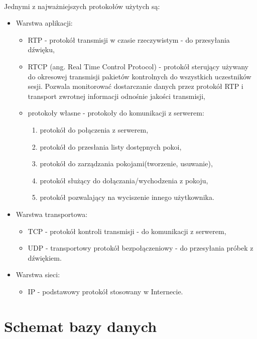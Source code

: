 \documentclass{article}
\begin{document}
	\paragraph*{} Jednymi z najważniejszych protokołów użytych są:
	\begin{itemize}
		\item Warstwa aplikacji:
		\begin{itemize}
			\item RTP - protokół transmisji w czasie rzeczywistym - do przesyłania dźwięku,
			\item RTCP (ang. Real Time Control Protocol) - protokół sterujący używany do okresowej transmisji pakietów kontrolnych do wszystkich uczestników sesji. Pozwala monitorować dostarczanie danych przez protokół RTP i transport zwrotnej informacji odnośnie jakości transmisji,
			\item protokoły własne - protokoły do komunikacji z serwerem:
			\begin{enumerate}
				\item protokół do połączenia z serwerem,
				\item protokół do przesłania listy dostępnych pokoi,
				\item protokół do zarządzania pokojami(tworzenie, usuwanie),
				\item protokół służący do dołączania/wychodzenia z pokoju,
				\item protokół pozwalający na wyciszenie innego użytkownika. 
			\end{enumerate}
		\end{itemize}
		\item Warstwa transportowa:
		\begin{itemize}
			\item TCP - protokół kontroli transmisji - do komunikacji z serwerem,
			\item UDP - transportowy protokół bezpołączeniowy - do przesyłania próbek z dźwiękiem.
		\end{itemize}
		\item Warstwa sieci:
		\begin{itemize}
			\item IP - podstawowy protokół stosowany w Internecie.
		\end{itemize}
	\end{itemize}
	\section{Schemat bazy danych} 
\end{document}
